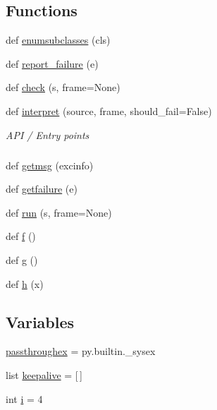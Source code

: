 \subsection*{Functions}
\begin{DoxyCompactItemize}
\item 
def \hyperlink{namespacepy_1_1__code_1_1__assertionold_afba8f754bbebb8eaee26b09461bbccd8}{enumsubclasses} (cls)
\item 
def \hyperlink{namespacepy_1_1__code_1_1__assertionold_ad8115b35facc356f7c304753ea98fa66}{report\+\_\+failure} (e)
\item 
def \hyperlink{namespacepy_1_1__code_1_1__assertionold_afb02e1654f4e41a2a518ce3bd6d48ef6}{check} (s, frame=None)
\item 
def \hyperlink{namespacepy_1_1__code_1_1__assertionold_ab10c3b3a1ec023e90cb016f2c4812c9d}{interpret} (source, frame, should\+\_\+fail=False)
\begin{DoxyCompactList}\small\item\em A\+PI / Entry points \subparagraph*{}\end{DoxyCompactList}\item 
def \hyperlink{namespacepy_1_1__code_1_1__assertionold_a8a33e6fd9504503d994102be9126fa32}{getmsg} (excinfo)
\item 
def \hyperlink{namespacepy_1_1__code_1_1__assertionold_ab1a1154e0a98afc2505be05db89e71a9}{getfailure} (e)
\item 
def \hyperlink{namespacepy_1_1__code_1_1__assertionold_a893713a870f50785f12c70dcb839a457}{run} (s, frame=None)
\item 
def \hyperlink{namespacepy_1_1__code_1_1__assertionold_af9716c108b600e06bfc899eabe7dccd3}{f} ()
\item 
def \hyperlink{namespacepy_1_1__code_1_1__assertionold_aabca2d3e0e59882fc183fa97d388d5e7}{g} ()
\item 
def \hyperlink{namespacepy_1_1__code_1_1__assertionold_a250fe12fbcff5c093d04194d0e9566f7}{h} (x)
\end{DoxyCompactItemize}
\subsection*{Variables}
\begin{DoxyCompactItemize}
\item 
\hyperlink{namespacepy_1_1__code_1_1__assertionold_a9dd54a59a5ef88f72363155c89dbe38a}{passthroughex} = py.\+builtin.\+\_\+sysex
\item 
list \hyperlink{namespacepy_1_1__code_1_1__assertionold_a56e739a9ba2a8b54f38332b9b693e1df}{keepalive} = \mbox{[}$\,$\mbox{]}
\item 
int \hyperlink{namespacepy_1_1__code_1_1__assertionold_a66ebe6cb8108b2287b83f90bb339a489}{i} = 4
\end{DoxyCompactItemize}


